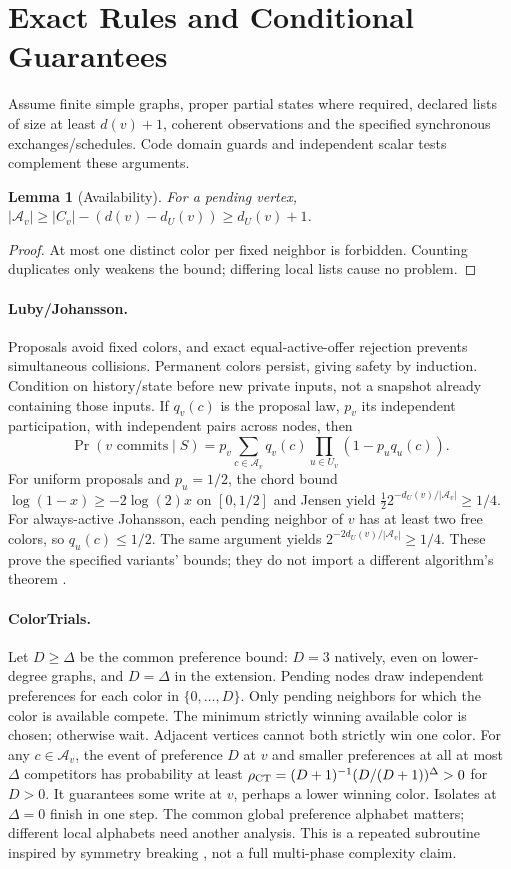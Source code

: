 \documentclass[10pt]{article}
\newtheorem{lemma}[proposition]{Lemma}
\newcommand{\A}{\mathcal A}
\begin{document}
\section{Exact Rules and Conditional Guarantees}\label{app:teachers}
Assume finite simple graphs, proper partial states where required, declared
lists of size at least $d(v)+1$, coherent observations and the specified
synchronous exchanges/schedules. Code domain guards and independent scalar
tests complement these arguments.
\begin{lemma}[Availability]
For a pending vertex, $|\A_v|\ge |C_v|-(d(v)-d_U(v))\ge d_U(v)+1$.
\end{lemma}
\begin{proof}
At most one distinct color per fixed neighbor is forbidden. Counting
duplicates only weakens the bound; differing local lists cause no problem.
\end{proof}
\paragraph{Luby/Johansson.}
Proposals avoid fixed colors, and exact equal-active-offer rejection prevents
simultaneous collisions. Permanent colors persist, giving safety by induction.
Condition on history/state before new private inputs, not a snapshot already
containing those inputs. If $q_v(c)$ is the proposal law, $p_v$ its independent
participation, with independent pairs across nodes, then
\begin{equation}\label{eq:progress}
\Pr(v\text{ commits}\mid S)=p_v\sum_{c\in\A_v}q_v(c)
\prod_{u\in U_v}(1-p_uq_u(c)).
\end{equation}
For uniform proposals and $p_u=1/2$, the chord bound
$\log(1-x)\ge-2\log(2)x$ on $[0,1/2]$ and Jensen yield
$\frac12 2^{-d_U(v)/|\A_v|}\ge1/4$.
For always-active Johansson, each pending neighbor of $v$ has at least two
free colors, so $q_u(c)\le1/2$. The same argument yields
$2^{-2d_U(v)/|\A_v|}\ge1/4$. These prove the specified variants' bounds;
they do not import a different algorithm's theorem
\citep{luby1993randomness,johansson1999coloring}.

\paragraph{ColorTrials.}
Let $D\ge\Delta$ be the common preference bound: $D=3$ natively, even on
lower-degree graphs, and $D=\Delta$ in the extension. Pending nodes draw
independent preferences for each color in $\{0,\ldots,D\}$. Only pending
neighbors for which the color is
available compete. The minimum strictly winning available color is chosen;
otherwise wait. Adjacent vertices cannot both strictly win one color.
For any $c\in\A_v$, the event of preference $D$ at $v$ and smaller
preferences at all at most $\Delta$ competitors has probability at least
$\rho_{\rm CT}=(D+1)^{-1}(D/(D+1))^\Delta>0$ for $D>0$.
It guarantees some write at $v$, perhaps a lower winning color. Isolates at
$\Delta=0$ finish in one step. The common global preference alphabet matters;
different local alphabets need another analysis. This is a repeated
subroutine inspired by symmetry breaking \citep{schneider2010symmetry}, not
a full multi-phase complexity claim.
\end{document}
